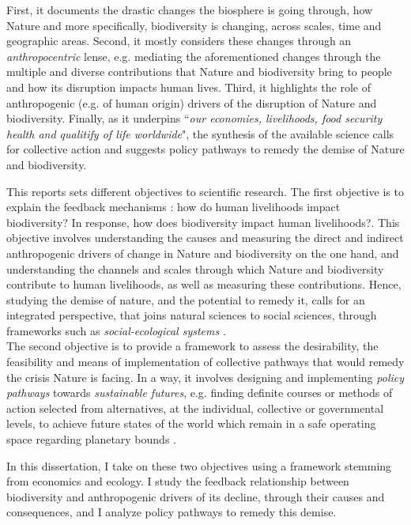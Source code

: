 First, it documents the drastic changes the biosphere is going through, how Nature and more specifically, biodiversity  is changing, across scales, time and geographic areas. Second, it mostly considers these changes through an \textit{anthropocentric} lense, e.g. mediating the aforementioned changes through the multiple and diverse contributions that Nature and biodiversity bring to people and how its disruption impacts human lives. Third, it highlights the role of anthropogenic (e.g. of human origin) drivers of the disruption of Nature and biodiversity. Finally, as it underpins ``\textit{our economies, livelihoods, food security health and qualitify of life worldwide}", the synthesis of the available science calls for collective action and suggests policy pathways to remedy the demise of Nature and biodiversity. 

 
This reports sets different objectives to scientific research. The first objective is to explain the feedback mechanisms : how do human livelihoods impact biodiversity? In response, how does biodiversity impact human livelihoods?. This objective involves understanding the causes and measuring the direct and indirect anthropogenic drivers of change in Nature and biodiversity on the one hand, and understanding the channels and scales through which Nature and biodiversity contribute to human livelihoods, as well as measuring these contributions. Hence, studying the demise of nature, and the potential to remedy it, calls for an integrated perspective, that joins natural sciences to social sciences, through frameworks such as \textit{social-ecological systems} \citep{Ostrom2009}. 
\\
The second objective is to provide a framework to assess the desirability, the feasibility and means of implementation of collective pathways that would remedy the crisis Nature is facing. In a way, it involves designing and implementing \textit{policy pathways} towards \textit{sustainable futures}, e.g. finding definite courses or methods of action selected from alternatives, at the individual, collective or governmental levels, to achieve future states of the world which remain in a safe operating space regarding planetary bounds \citep{rockstrom2009safe,steffen_2015_planetary}.


In this dissertation, I take on these two objectives using a framework stemming from economics and ecology. I study the feedback relationship between biodiversity and anthropogenic drivers of its decline, through their causes and consequences, and I analyze policy pathways to remedy this demise. 


